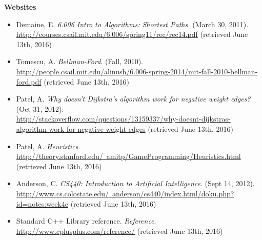 \documentclass[11pt]{article}
\begin{document}
\noindent \textbf{Websites}
\begin{itemize}
\item Demaine, E. \textit{6.006 Intro to Algorithms: Shortest Paths.} (March 30, 2011).\\\href{http://courses.csail.mit.edu/6.006/spring11/rec/rec14.pdf}{http://courses.csail.mit.edu/6.006/spring11/rec/rec14.pdf} (retrieved June 13th, 2016)

\item Tomescu, A. \textit{Bellman-Ford}. (Fall, 2010).\\\href{http://people.csail.mit.edu/alinush/6.006-spring-2014/mit-fall-2010-bellman-ford.pdf}{http://people.csail.mit.edu/alinush/6.006-spring-2014/mit-fall-2010-bellman-ford.pdf} (retrieved June 13th, 2016)

\item \sloppy Patel, A. \textit{Why doesn't Dijkstra's algorithm work for negative weight edges?} (Oct 31, 2012).\\\href{http://stackoverflow.com/questions/13159337/why-doesnt-dijkstras-algorithm-work-for-negative-weight-edges}{http://stackoverflow.com/questions/13159337/why-doesnt-dijkstras-algorithm-work-for-negative-weight-edges} (retrieved June 13th, 2016)

\item Patel, A. \textit{Heuristics}.\\\href{http://theory.stanford.edu/~amitp/GameProgramming/Heuristics.html}{http://theory.stanford.edu/~amitp/GameProgramming/Heuristics.html} (retrieved June 13th, 2016)

\item Anderson, C. \textit{CS440: Introduction to Artificial Intelligence}. (Sept 14, 2012).\\\href{http://www.cs.colostate.edu/~anderson/cs440/index.html/doku.php?id=notes:week4c}{http://www.cs.colostate.edu/~anderson/cs440/index.html/doku.php?id=notes:week4c} (retrieved June 13th, 2016)

\item Standard C++ Library reference. \textit{Reference}.\\\href{http://www.cplusplus.com/reference/}{http://www.cplusplus.com/reference/} (retrieved June 13th, 2016)

\end{itemize}






\newpage
\end{document}
